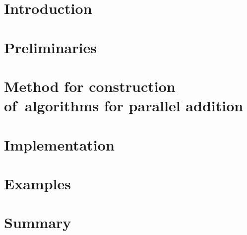 \documentclass[a4paper, 11pt]{report}
\theoremstyle{definition}
\begin{document}

\chapter*{Introduction}


\chapter{Preliminaries}




\chapter{Method for construction of~algorithms for parallel addition}



\chapter{Implementation}

\chapter{Examples}


\chapter*{Summary}



\newpage
% 


\end{document}
